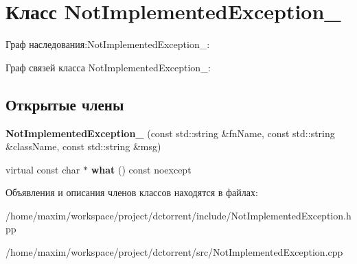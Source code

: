 \hypertarget{class_not_implemented_exception__}{}\section{Класс Not\+Implemented\+Exception\+\_\+}
\label{class_not_implemented_exception__}


Граф наследования\+:Not\+Implemented\+Exception\+\_\+\+:


Граф связей класса Not\+Implemented\+Exception\+\_\+\+:
\subsection*{Открытые члены}
\begin{DoxyCompactItemize}
\item 
\mbox{\label{class_not_implemented_exception___ab10428134a851c0f564d142a497b4d3f}} 
{\bfseries Not\+Implemented\+Exception\+\_\+} (const std\+::string \&fn\+Name, const std\+::string \&class\+Name, const std\+::string \&msg)
\item 
\mbox{\label{class_not_implemented_exception___a7a92099331b07ede1d316e8340ce207a}} 
virtual const char $\ast$ {\bfseries what} () const noexcept
\end{DoxyCompactItemize}


Объявления и описания членов классов находятся в файлах\+:\begin{DoxyCompactItemize}
\item 
/home/maxim/workspace/project/dctorrent/include/Not\+Implemented\+Exception.\+hpp\item 
/home/maxim/workspace/project/dctorrent/src/Not\+Implemented\+Exception.\+cpp\end{DoxyCompactItemize}
